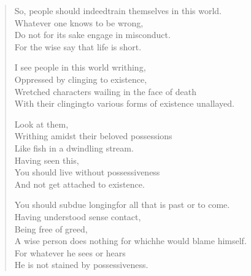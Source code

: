 \begin{verse}
 So, people should indeed\newline train themselves in this world.\\
Whatever one knows to be wrong,\\
Do not for its sake engage in misconduct.\\
For the wise say that life is short.


 I see people in this world writhing,\\
Oppressed by clinging to existence,\\
Wretched characters wailing in the face of death\\
With their clinging\newline to various forms of existence unallayed.


 Look at them,\\
Writhing amidst their beloved possessions\\
Like fish in a dwindling stream.\\
Having seen this,\\
You should live without possessiveness\\
And not get attached to existence.


 You should subdue longing\newline for all that is past or to come.\\
Having understood sense contact,\\
Being free of greed,\\
A wise person does nothing for which\newline he would blame himself.\\
For whatever he sees or hears\\
He is not stained by possessiveness.


\end{verse}
